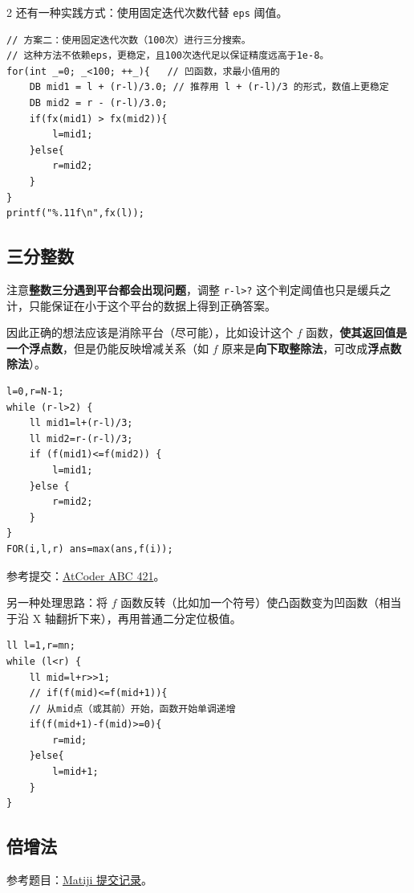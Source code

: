 \begin{multicols*}{2}
		还有一种实践方式：使用固定迭代次数代替 \texttt{eps} 阈值。

		\begin{verbatim}
// 方案二：使用固定迭代次数（100次）进行三分搜索。
// 这种方法不依赖eps，更稳定，且100次迭代足以保证精度远高于1e-8。
for(int _=0; _<100; ++_){   // 凹函数，求最小值用的
    DB mid1 = l + (r-l)/3.0; // 推荐用 l + (r-l)/3 的形式，数值上更稳定
    DB mid2 = r - (r-l)/3.0;
    if(fx(mid1) > fx(mid2)){
        l=mid1;
    }else{
        r=mid2;
    }
}
printf("%.11f\n",fx(l));
		\end{verbatim}

		\subsection{三分整数}

		注意\textbf{整数三分遇到平台都会出现问题}，调整 \texttt{r-l>?} 这个判定阈值也只是缓兵之计，只能保证在小于这个平台的数据上得到正确答案。

		因此正确的想法应该是消除平台（尽可能），比如设计这个 $f$ 函数，\textbf{使其返回值是一个浮点数}，但是仍能反映增减关系（如 $f$ 原来是\textbf{向下取整除法}，可改成\textbf{浮点数除法}）。

		\begin{verbatim}
l=0,r=N-1;
while (r-l>2) {
    ll mid1=l+(r-l)/3;
    ll mid2=r-(r-l)/3;
    if (f(mid1)<=f(mid2)) {
        l=mid1;
    }else {
        r=mid2;
    }
}
FOR(i,l,r) ans=max(ans,f(i));
		\end{verbatim}

		参考提交：\href{https://atcoder.jp/contests/abc421/submissions/68978595}{AtCoder ABC 421}。

		另一种处理思路：将 $f$ 函数反转（比如加一个符号）使凸函数变为凹函数（相当于沿 X 轴翻折下来），再用普通二分定位极值。

		\begin{verbatim}
ll l=1,r=mn;
while (l<r) {
    ll mid=l+r>>1;
    // if(f(mid)<=f(mid+1)){
    // 从mid点（或其前）开始，函数开始单调递增
    if(f(mid+1)-f(mid)>=0){
        r=mid;
    }else{
        l=mid+1;
    }
}
		\end{verbatim}

		\subsection{倍增法}

		参考题目：\href{https://www.matiji.net/exam/oj/submit-detail/13507760/29/4498/F16DA07A4D99E21DFFEF46BD18FF68AD}{Matiji 提交记录}。


\end{multicols*}
